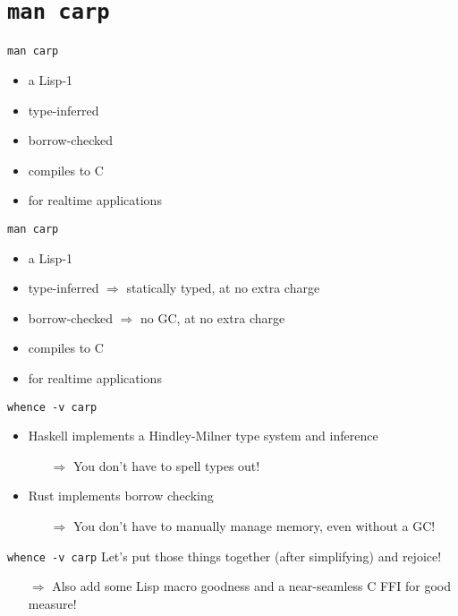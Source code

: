 \documentclass[aspectratio=169]{beamer}
\begin{document}
  \section{\texttt{man carp}}
  \begin{frame}{\texttt{man carp}}
    \begin{itemize}
      \item a Lisp-1
      \item type-inferred
      \item borrow-checked
      \item compiles to C
      \item for realtime applications
    \end{itemize}
  \end{frame}
  \begin{frame}{\texttt{man carp}}
    \begin{itemize}
      \item a Lisp-1
      \item type-inferred $\Rightarrow$ statically typed, at no extra charge
      \item borrow-checked $\Rightarrow$ no GC, at no extra charge
      \item compiles to C
      \item for realtime applications
    \end{itemize}
  \end{frame}
  \begin{frame}{\texttt{whence -v carp}}
    \begin{itemize}
      \item Haskell implements a Hindley-Milner type system and inference
      \begin{itemize}
        \item[$\Rightarrow$] You don’t have to spell types out!
      \end{itemize}
      \item Rust implements borrow checking
      \begin{itemize}
        \item[$\Rightarrow$] You don’t have to manually manage memory, even without a GC!
      \end{itemize}
    \end{itemize}
  \end{frame}
  \begin{frame}{\texttt{whence -v carp}}
    Let’s put those things together (after simplifying) and rejoice!
    \begin{itemize}
      \item[$\Rightarrow$] Also add some Lisp macro goodness and a near-seamless C FFI for good measure!
    \end{itemize}
  \end{frame}
\end{document}
